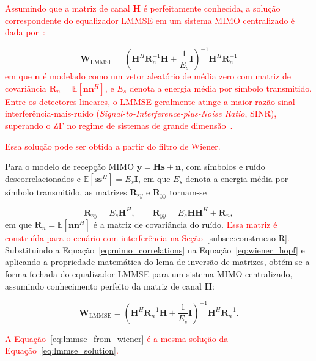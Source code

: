 \textcolor{red}{Assumindo que a matriz de canal $\mathbf{H}$ é perfeitamente conhecida, a solução correspondente do equalizador LMMSE em um sistema MIMO centralizado é dada por~\cite{zhao2025jsac}:}

\begin{equation}
\mathbf{W}_\text{LMMSE}=
\left(
\mathbf{H}^H\mathbf{R}_n^{-1}\mathbf{H}
+
\frac{1}{E_s}\mathbf{I}
\right)^{-1}
\mathbf{H}^H\mathbf{R}_n^{-1}
\label{eq:lmmse_solution}
\end{equation}
\textcolor{red}{em que $\mathbf{n}$ é modelado como um vetor aleatório de média zero com matriz de covariância $\mathbf{R}_n = \mathbb{E}[\mathbf{n}\mathbf{n}^H]$, e $E_s$ denota a energia média por símbolo transmitido. Entre os detectores lineares, o LMMSE geralmente atinge a maior razão sinal-interferência-mais-ruído (\textit{Signal-to-Interference-plus-Noise Ratio}, SINR), superando o ZF no regime de sistemas de grande dimensão~\cite{jeon2019}.}


\textcolor{red}{Essa solução pode ser obtida a partir do filtro de Wiener.}

Para o modelo de recepção MIMO $\mathbf{y}=\mathbf{H}\mathbf{s}+\mathbf{n}$, com símbolos e ruído
descorrelacionados e $\mathbb{E}[\mathbf{s}\mathbf{s}^H]=E_s\mathbf{I}$, em
que $E_s$ denota a energia média por símbolo transmitido, as matrizes
$\mathbf{R}_{sy}$ e $\mathbf{R}_{yy}$ tornam-se

\begin{equation}
\mathbf{R}_{sy}=E_s\mathbf{H}^H,
\qquad
\mathbf{R}_{yy}=E_s\mathbf{H}\mathbf{H}^H+\mathbf{R}_n,
\label{eq:mimo_correlations}
\end{equation}
em que $\mathbf{R}_n=\mathbb{E}[\mathbf{n}\mathbf{n}^H]$ é a matriz de
covariância do ruído. \textcolor{red}{Essa matriz é construída para o cenário com interferência na Seção~{\hypersetup{linkcolor=red}\ref{subsec:construcao-R}}.}
Substituindo a Equação~\eqref{eq:mimo_correlations} na
Equação~\eqref{eq:wiener_hopf} e aplicando a propriedade matemática do lema de inversão de matrizes,
obtém-se a forma fechada do equalizador LMMSE para um sistema MIMO
centralizado, assumindo conhecimento perfeito da matriz de canal $\mathbf{H}$:

\begin{equation}
\mathbf{W}_\text{LMMSE}=
\left(\mathbf{H}^H\mathbf{R}_n^{-1}\mathbf{H}+\frac{1}{E_s}\mathbf{I}\right)^{-1}
\mathbf{H}^H\mathbf{R}_n^{-1}.
\label{eq:lmmse_from_wiener}
\end{equation}

\textcolor{red}{A Equação~{\hypersetup{linkcolo=red}\eqref{eq:lmmse_from_wiener}} é a mesma solução da Equação~{\hypersetup{linkcolor=red}\eqref{eq:lmmse_solution}}.}


